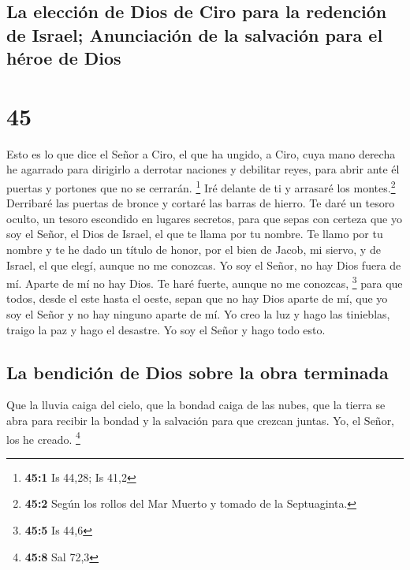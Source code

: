 \hypertarget{la-elecciuxf3n-de-dios-de-ciro-para-la-redenciuxf3n-de-israel-anunciaciuxf3n-de-la-salvaciuxf3n-para-el-huxe9roe-de-dios}{%
\subsection{La elección de Dios de Ciro para la redención de Israel;
Anunciación de la salvación para el héroe de
Dios}\label{la-elecciuxf3n-de-dios-de-ciro-para-la-redenciuxf3n-de-israel-anunciaciuxf3n-de-la-salvaciuxf3n-para-el-huxe9roe-de-dios}}

\hypertarget{section-44}{%
\section{45}\label{section-44}}

 Esto es lo que dice el Señor a Ciro, el que ha ungido, a
Ciro, cuya mano derecha he agarrado para dirigirlo a derrotar naciones y
debilitar reyes, para abrir ante él puertas y portones que no se
cerrarán. \footnote{\textbf{45:1} Is 44,28; Is 41,2}  Iré
delante de ti y arrasaré los montes.\footnote{\textbf{45:2} Según los
  rollos del Mar Muerto y tomado de la Septuaginta.} Derribaré las
puertas de bronce y cortaré las barras de hierro.  Te daré
un tesoro oculto, un tesoro escondido en lugares secretos, para que
sepas con certeza que yo soy el Señor, el Dios de Israel, el que te
llama por tu nombre.  Te llamo por tu nombre y te he dado
un título de honor, por el bien de Jacob, mi siervo, y de Israel, el que
elegí, aunque no me conozcas.  Yo soy el Señor, no hay
Dios fuera de mí. Aparte de mí no hay Dios. Te haré fuerte, aunque no me
conozcas, \footnote{\textbf{45:5} Is 44,6}  para que
todos, desde el este hasta el oeste, sepan que no hay Dios aparte de mí,
que yo soy el Señor y no hay ninguno aparte de mí.  Yo
creo la luz y hago las tinieblas, traigo la paz y hago el desastre. Yo
soy el Señor y hago todo esto.

\hypertarget{la-bendiciuxf3n-de-dios-sobre-la-obra-terminada}{%
\subsection{La bendición de Dios sobre la obra
terminada}\label{la-bendiciuxf3n-de-dios-sobre-la-obra-terminada}}

 Que la lluvia caiga del cielo, que la bondad caiga de las
nubes, que la tierra se abra para recibir la bondad y la salvación para
que crezcan juntas. Yo, el Señor, los he creado. \footnote{\textbf{45:8}
  Sal 72,3}

